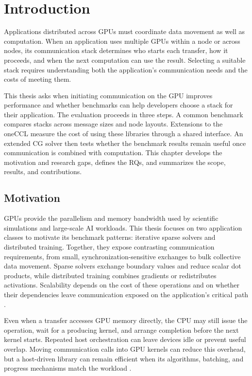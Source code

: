 \chapter{Introduction}\label{ch}

Applications distributed across \acp{GPU} must coordinate data movement as well as computation. When an application uses multiple GPUs within a node or across nodes, its communication stack determines who starts each transfer, how it proceeds, and when the next computation can use the result. Selecting a suitable stack requires understanding both the application's communication needs and the costs of meeting them.

This thesis asks when initiating communication on the GPU improves performance and whether benchmarks can help developers choose a stack for their application. The evaluation proceeds in three steps. A common benchmark compares stacks across message sizes and node layouts. Extensions to the \ac{oneCCL} measure the cost of using these libraries through a shared interface. An extended \ac{CG} solver then tests whether the benchmark results remain useful once communication is combined with computation. This chapter develops the motivation and research gaps, defines the \acp{RQ}, and summarizes the scope, results, and contributions.

\section{Motivation}

GPUs provide the parallelism and memory bandwidth used by scientific simulations and large-scale \ac{AI} workloads. This thesis focuses on two application classes to motivate its benchmark patterns: iterative sparse solvers and distributed training. Together, they expose contrasting communication requirements, from small, synchronization-sensitive exchanges to bulk collective data movement. Sparse solvers exchange boundary values and reduce scalar dot products, while distributed training combines gradients or redistributes activations. Scalability depends on the cost of these operations and on whether their dependencies leave communication exposed on the application's critical path \cite{unat_landscape_2026,choi_end--end_2020}.

Even when a transfer accesses GPU memory directly, the \ac{CPU} may still issue the operation, wait for a producing kernel, and arrange completion before the next kernel starts. Repeated host orchestration can leave devices idle or prevent useful overlap. Moving communication calls into GPU kernels can reduce this overhead, but a host-driven library can remain efficient when its algorithms, batching, and progress mechanisms match the workload \cite{unat_landscape_2026,agostini_gpudirect_2018}.

